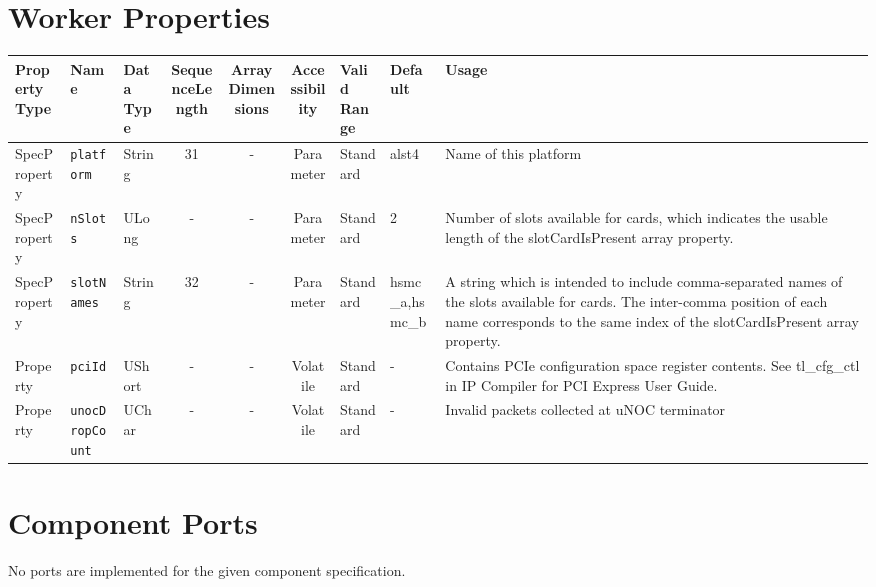 \documentclass{article}
\begin{document}
\begin{landscape}
	\section*{Worker Properties}
	\begin{scriptsize}
		\begin{tabular}{|p{1.5cm}|p{2.5cm}|p{1.5cm}|c|c|c|p{2cm}|p{2cm}|p{3cm}|}
			\hline
			\rowcolor{blue}
			Property Type & Name                  & Data Type  & SequenceLength & ArrayDimensions & Accessibility       & Valid Range & Default & Usage                        \\
			\hline
			SpecProperty & \verb+platform+       & String & 31            & -               & Parameter & Standard & alst4 & Name of this platform               \\
			\hline
			SpecProperty & \verb+nSlots+         & ULong  & -             & -               & Parameter & Standard & 2 & Number of slots available for cards, which indicates the usable length of the slotCardIsPresent array property. \\
			\hline
			SpecProperty & \verb+slotNames+      & String & 32            & -               & Parameter & Standard & hsmc\_a,hsmc\_b   & A string which is intended to include comma-separated names of the slots available for cards. The inter-comma position of each name corresponds to the same index of the slotCardIsPresent array property. \\
			\hline
			Property & \verb+pciId+              & UShort & -             & -               & Volatile            & Standard    & -       & Contains PCIe configuration space register contents. See tl\_cfg\_ctl in IP Compiler for PCI Express User Guide. \\
			\hline
			Property & \verb+unocDropCount+      & UChar & -              & -               & Volatile            & Standard    & -       & Invalid packets collected at uNOC terminator \\
			\hline
		\end{tabular}
	\end{scriptsize}

	\section*{Component Ports}
	No ports are implemented for the given component specification.


\end{landscape}
\end{document}

